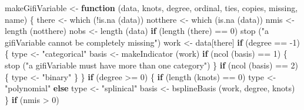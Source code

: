 \documentclass[
  12pt,
]{book}
\newenvironment{Shaded}{\begin{snugshade}}{\end{snugshade}}
\newcommand{\ControlFlowTok}[1]{\textcolor[rgb]{0.13,0.29,0.53}{\textbf{#1}}}
\newcommand{\DecValTok}[1]{\textcolor[rgb]{0.00,0.00,0.81}{#1}}
\newcommand{\FunctionTok}[1]{\textcolor[rgb]{0.00,0.00,0.00}{#1}}
\newcommand{\NormalTok}[1]{#1}
\newcommand{\OtherTok}[1]{\textcolor[rgb]{0.56,0.35,0.01}{#1}}
\newcommand{\SpecialCharTok}[1]{\textcolor[rgb]{0.00,0.00,0.00}{#1}}
\newcommand{\StringTok}[1]{\textcolor[rgb]{0.31,0.60,0.02}{#1}}
\begin{document}
\begin{Shaded}
\begin{Highlighting}[]
\NormalTok{makeGifiVariable }\OtherTok{\textless{}{-}}
  \ControlFlowTok{function}\NormalTok{ (data,}
\NormalTok{            knots,}
\NormalTok{            degree,}
\NormalTok{            ordinal,}
\NormalTok{            ties,}
\NormalTok{            copies,}
\NormalTok{            missing,}
\NormalTok{            name) \{}
\NormalTok{    there }\OtherTok{\textless{}{-}} \FunctionTok{which}\NormalTok{ (}\SpecialCharTok{!}\FunctionTok{is.na}\NormalTok{ (data))}
\NormalTok{    notthere }\OtherTok{\textless{}{-}} \FunctionTok{which}\NormalTok{ (}\FunctionTok{is.na}\NormalTok{ (data))}
\NormalTok{    nmis }\OtherTok{\textless{}{-}} \FunctionTok{length}\NormalTok{ (notthere)}
\NormalTok{    nobs }\OtherTok{\textless{}{-}} \FunctionTok{length}\NormalTok{ (data)}
    \ControlFlowTok{if}\NormalTok{ (}\FunctionTok{length}\NormalTok{ (there) }\SpecialCharTok{==} \DecValTok{0}\NormalTok{)}
      \FunctionTok{stop}\NormalTok{ (}\StringTok{"a gifiVariable cannot be completely missing"}\NormalTok{)}
\NormalTok{    work }\OtherTok{\textless{}{-}}\NormalTok{ data[there]}
    \ControlFlowTok{if}\NormalTok{ (degree }\SpecialCharTok{==} \SpecialCharTok{{-}}\DecValTok{1}\NormalTok{) \{}
\NormalTok{      type }\OtherTok{\textless{}{-}} \StringTok{"categorical"}
\NormalTok{      basis }\OtherTok{\textless{}{-}} \FunctionTok{makeIndicator}\NormalTok{ (work)}
      \ControlFlowTok{if}\NormalTok{ (}\FunctionTok{ncol}\NormalTok{ (basis) }\SpecialCharTok{==} \DecValTok{1}\NormalTok{) \{}
        \FunctionTok{stop}\NormalTok{ (}\StringTok{"a gifiVariable must have more than one category"}\NormalTok{)}
\NormalTok{      \}}
      \ControlFlowTok{if}\NormalTok{ (}\FunctionTok{ncol}\NormalTok{ (basis) }\SpecialCharTok{==} \DecValTok{2}\NormalTok{) \{}
\NormalTok{        type }\OtherTok{\textless{}{-}} \StringTok{"binary"}
\NormalTok{      \}}
\NormalTok{    \}}
    \ControlFlowTok{if}\NormalTok{ (degree }\SpecialCharTok{\textgreater{}=} \DecValTok{0}\NormalTok{) \{}
      \ControlFlowTok{if}\NormalTok{ (}\FunctionTok{length}\NormalTok{ (knots) }\SpecialCharTok{==} \DecValTok{0}\NormalTok{)}
\NormalTok{        type }\OtherTok{\textless{}{-}} \StringTok{"polynomial"}
      \ControlFlowTok{else}
\NormalTok{        type }\OtherTok{\textless{}{-}} \StringTok{"splinical"}
\NormalTok{      basis }\OtherTok{\textless{}{-}} \FunctionTok{bsplineBasis}\NormalTok{ (work, degree, knots)}
\NormalTok{    \}}
     \ControlFlowTok{if}\NormalTok{ (nmis }\SpecialCharTok{\textgreater{}} \DecValTok{0}\NormalTok{)}

\end{Highlighting}
\end{Shaded}
\end{document}
